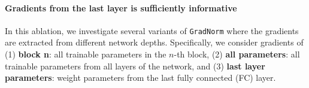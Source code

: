 \documentclass{article}
\begin{document}








\paragraph{Gradients from the last layer is sufficiently informative} 
In this ablation, we investigate several variants of \texttt{GradNorm} where the gradients are extracted from different network depths. Specifically, we consider gradients of (1) \textbf{block n}: all trainable parameters in the $n$-th block, (2) \textbf{all parameters}: all trainable parameters from all layers of the network, %
and (3) \textbf{last layer parameters}: weight parameters from the last fully connected (FC) layer. 
\end{document}
